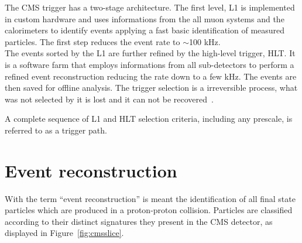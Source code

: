 The CMS trigger has a two-stage architecture. The first level, L1 is
implemented in custom hardware and uses informations from the 
all muon systems and the calorimeters to identify events applying a fast
basic identification of measured particles. The first step reduces the
event rate to $\sim$100 kHz.\\
The events sorted by the L1 are further refined by the
high-level trigger, HLT. It is a software farm that employs informations from all sub-detectors to perform a
refined event reconstruction reducing the rate down to a few kHz. The 
events are then saved for offline analysis.
The trigger selection is a irreversible process, what was not selected
by it is lost and it can not be recovered~\cite{Khachatryan_2017}.

A complete sequence of L1
and HLT selection criteria, including any prescale, is referred to
as a trigger path.

\clearpage

\section{Event reconstruction}\label{sec:reconstruction}
With the term ``event reconstruction'' is meant the identification of
all final state particles which are produced in a proton-proton
collision. Particles are classified according to their distinct
signatures they present in 
the CMS detector, as displayed in Figure~\ref{fig:cmsslice}.

